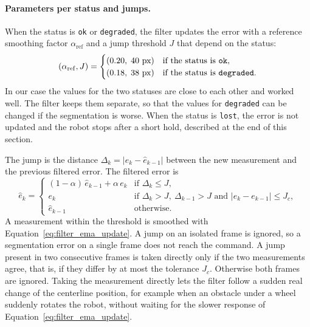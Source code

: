 \paragraph{Parameters per status and jumps.}
When the status is \texttt{ok} or \texttt{degraded}, the filter updates the error with a reference smoothing factor $\alpha_{\mathrm{ref}}$ and a jump threshold $J$ that depend on the status:
\begin{equation}
    (\alpha_{\mathrm{ref}}, J) =
    \begin{cases}
        (0.20, \; 40\text{ px}) & \text{if the status is \texttt{ok}}, \\
        (0.18, \; 38\text{ px}) & \text{if the status is \texttt{degraded}}.
    \end{cases}
    \label{eq:filter_regimes}
\end{equation}
In our case the values for the two statuses are close to each other and worked well. The filter keeps them separate, so that the values for \texttt{degraded} can be changed if the segmentation is worse. When the status is \texttt{lost}, the error is not updated and the robot stops after a short hold, described at the end of this section.

The jump is the distance $\Delta_k = |e_k - \hat{e}_{k-1}|$ between the new measurement and the previous filtered error. The filtered error is
\begin{equation}
    \hat{e}_k =
    \begin{cases}
        (1 - \alpha)\, \hat{e}_{k-1} + \alpha \, e_k & \text{if } \Delta_k \le J, \\
        e_k & \text{if } \Delta_k > J,\ \Delta_{k-1} > J \text{ and } |e_k - e_{k-1}| \le J_c, \\
        \hat{e}_{k-1} & \text{otherwise}.
    \end{cases}
    \label{eq:filter_jump}
\end{equation}
A measurement within the threshold is smoothed with Equation~\eqref{eq:filter_ema_update}. A jump on an isolated frame is ignored, so a segmentation error on a single frame does not reach the command. A jump present in two consecutive frames is taken directly only if the two measurements agree, that is, if they differ by at most the tolerance $J_c$. Otherwise both frames are ignored. Taking the measurement directly lets the filter follow a sudden real change of the centerline position, for example when an obstacle under a wheel suddenly rotates the robot, without waiting for the slower response of Equation~\eqref{eq:filter_ema_update}.

